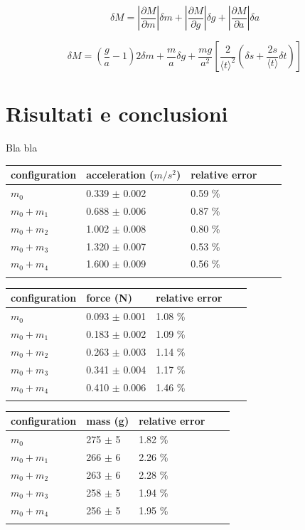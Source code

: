 \documentclass[11pt,a4paper]{article}
\begin{document}
\begin{equation}
    \delta M = \left| \frac{\partial M}{\partial m} \right| \delta m + \left| \frac{\partial M}{\partial g} \right| \delta g + \left| \frac{\partial M}{\partial a} \right| \delta a
\end{equation}

\begin{equation}
    \delta M = \left( \frac{g}{a} -1 \right)2 \delta m + \frac{m}{a} \delta g + \frac{mg}{a^2}  \left [ \frac{2}{\langle t \rangle^2} \left( \delta s + \frac{2s}{\langle t \rangle}\delta t \right)\right]
\end{equation}

\section{Risultati e conclusioni}
Bla bla 

\begin{longtable}[]{@{}lllll@{}}
\toprule
configuration & acceleration ($m/s^2$) & relative error \tabularnewline
\midrule
\endhead
$m_0$ & 0.339 $\pm$ 0.002 & 0.59 \% \tabularnewline
$m_0+m_1$ & 0.688 $\pm$ 0.006 & 0.87 \% \tabularnewline
$m_0+m_2$ & 1.002 $\pm$ 0.008 & 0.80 \% \tabularnewline
$m_0+m_3$ & 1.320 $\pm$ 0.007 & 0.53 \% \tabularnewline
$m_0+m_4$ & 1.600 $\pm$ 0.009 & 0.56 \% \tabularnewline
\bottomrule
\label{output1}
\end{longtable}

\begin{longtable}[]{@{}lllll@{}}
\toprule
configuration & force (N) & relative error \tabularnewline
\midrule
\endhead
$m_0$ & 0.093 $\pm$ 0.001 & 1.08 \% \tabularnewline
$m_0+m_1$ & 0.183 $\pm$ 0.002 & 1.09 \% \tabularnewline
$m_0+m_2$ & 0.263 $\pm$ 0.003 & 1.14 \% \tabularnewline
$m_0+m_3$ & 0.341 $\pm$ 0.004 & 1.17 \% \tabularnewline
$m_0+m_4$ & 0.410 $\pm$ 0.006 & 1.46 \% \tabularnewline
\bottomrule
\label{output2}
\end{longtable}

\begin{longtable}[]{@{}lllll@{}}
\toprule
configuration & mass (g) & relative error \tabularnewline
\midrule
\endhead
$m_0$ & 275 $\pm$ 5 & 1.82 \% \tabularnewline
$m_0+m_1$ & 266 $\pm$ 6 & 2.26 \% \tabularnewline
$m_0+m_2$ & 263 $\pm$ 6 & 2.28 \% \tabularnewline
$m_0+m_3$ & 258 $\pm$ 5 & 1.94 \% \tabularnewline
$m_0+m_4$ & 256 $\pm$ 5 & 1.95 \% \tabularnewline
\bottomrule
\label{output3}
\end{longtable}
\end{document}
